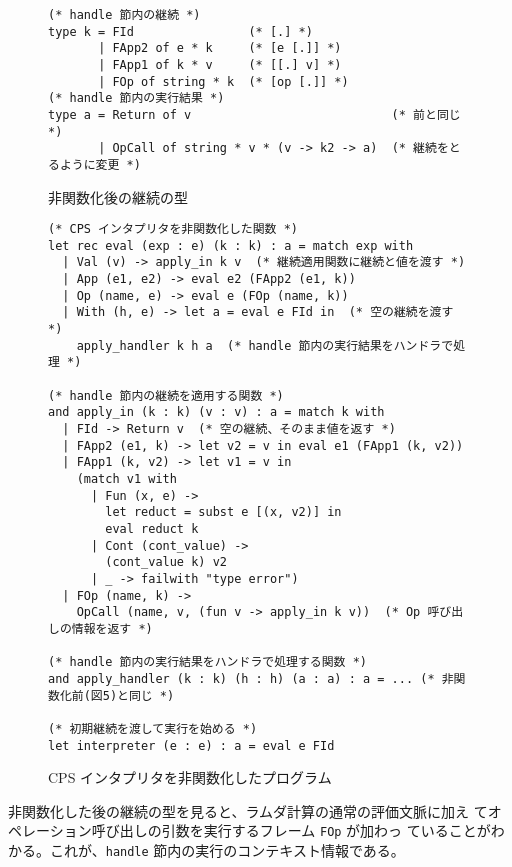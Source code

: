 \begin{figure}
\begin{spacing}{0.9}
\begin{verbatim}
(* handle 節内の継続 *)
type k = FId                (* [.] *)
       | FApp2 of e * k     (* [e [.]] *)
       | FApp1 of k * v     (* [[.] v] *)
       | FOp of string * k  (* [op [.]] *)
(* handle 節内の実行結果 *)
type a = Return of v                            (* 前と同じ *)
       | OpCall of string * v * (v -> k2 -> a)  (* 継続をとるように変更 *)
\end{verbatim}
\caption{非関数化後の継続の型}
\label{figure:k_2defun}
\end{spacing}
\end{figure}

\begin{figure}[t]
\begin{spacing}{0.9}
\begin{verbatim}
(* CPS インタプリタを非関数化した関数 *)
let rec eval (exp : e) (k : k) : a = match exp with
  | Val (v) -> apply_in k v  (* 継続適用関数に継続と値を渡す *)
  | App (e1, e2) -> eval e2 (FApp2 (e1, k))
  | Op (name, e) -> eval e (FOp (name, k))
  | With (h, e) -> let a = eval e FId in  (* 空の継続を渡す *)
    apply_handler k h a  (* handle 節内の実行結果をハンドラで処理 *)

(* handle 節内の継続を適用する関数 *)
and apply_in (k : k) (v : v) : a = match k with
  | FId -> Return v  (* 空の継続、そのまま値を返す *)
  | FApp2 (e1, k) -> let v2 = v in eval e1 (FApp1 (k, v2))
  | FApp1 (k, v2) -> let v1 = v in
    (match v1 with
      | Fun (x, e) ->
        let reduct = subst e [(x, v2)] in
        eval reduct k
      | Cont (cont_value) ->
        (cont_value k) v2
      | _ -> failwith "type error")
  | FOp (name, k) ->
    OpCall (name, v, (fun v -> apply_in k v))  (* Op 呼び出しの情報を返す *)

(* handle 節内の実行結果をハンドラで処理する関数 *)
and apply_handler (k : k) (h : h) (a : a) : a = ... (* 非関数化前(図5)と同じ *)

(* 初期継続を渡して実行を始める *)
let interpreter (e : e) : a = eval e FId
\end{verbatim}
\caption{CPS インタプリタを非関数化したプログラム}
\label{figure:2defun}
\end{spacing}
\end{figure}

非関数化した後の継続の型を見ると、ラムダ計算の通常の評価文脈に加え
てオペレーション呼び出しの引数を実行するフレーム \texttt{FOp} が加わっ
ていることがわかる。これが、\texttt{handle} 節内の実行のコンテキスト情報である。

